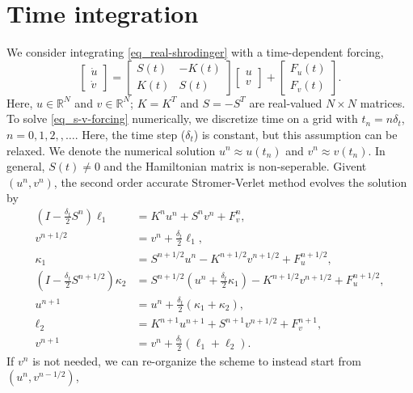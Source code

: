 \documentclass[11pt]{article}
\begin{document}
\section{Time integration}
We consider integrating \eqref{eq_real-shrodinger} with a time-dependent forcing,
\begin{equation}\label{eq_s-v-forcing}
  \begin{bmatrix} \dot{u}\\ \dot{v} \end{bmatrix} =
%
  \begin{bmatrix}
    S(t) & -K(t) \\ K(t) & S(t)
  \end{bmatrix}     
  \begin{bmatrix} u\\ v \end{bmatrix}
  + \begin{bmatrix} F_u(t) \\ F_v(t) \end{bmatrix}.
\end{equation}
Here, $u\in \mathbb{R}^N$ and $v\in \mathbb{R}^N$; $K=K^T$ and $S=-S^T$ are real-valued $N\times N$
matrices.  To solve \eqref{eq_s-v-forcing} numerically, we discretize time on a grid with $t_n = n
\delta_t$, $n=0,1,2,,\ldots$. Here, the time step ($\delta_t$) is constant, but this assumption can
be relaxed. We denote the numerical solution $u^n\approx u(t_n)$ and $v^n\approx v(t_n)$.  In
general, $S(t)\ne0$ and the Hamiltonian matrix is non-seperable. Givent $(u^n, v^n)$, the second order accurate
Stromer-Verlet method evolves the solution by
\begin{align*}
  \left(I - \frac{\delta_t}{2} S^{n}\right) \ell_1 &= K^n u^n + S^n v^n + F_v^n,\\
%
  v^{n+1/2} &= v^n + \frac{\delta_t}{2}\ell_1,\\
  \kappa_1 &= S^{n+1/2} u^n - K^{n+1/2} v^{n+1/2} +
  F_u^{n+1/2},\\
%
  \left(I - \frac{\delta_t}{2} S^{n+1/2}\right) \kappa_2 &= S^{n+1/2}\left( u^n + \frac{\delta_t}{2}
  \kappa_1 \right) - K^{n+1/2}  v^{n+1/2} + F_u^{n+1/2},\\
  u^{n+1} &= u^n + \frac{\delta_t}{2}\left( \kappa_1 + \kappa_2 \right),\\
%
  \ell_2 &= K^{n+1} u^{n+1} + S^{n+1}  v^{n+1/2} + F_v^{n+1},\\
  v^{n+1} &= v^n + \frac{\delta_t}{2}\left( \ell_1 + \ell_2 \right).
\end{align*}
If $v^n$ is not needed, we can re-organize the scheme to instead start from $(u^n, v^{n-1/2})$,
\end{document}
